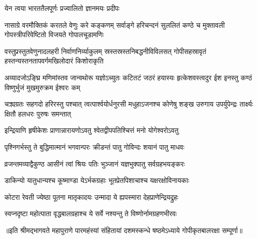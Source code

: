 

{येन त्वया भारततैलपूर्णः प्रज्वालितो ज्ञानमयः प्रदीपः}

{नासाग्रे वरमौक्तिकं करतले वेणुः करे कङ्कणम्}
{सर्वाङ्गे हरिचन्दनं सुललितं कण्ठे च मुक्तावली}
{गोपस्त्रीपरिवेष्टितो विजयते गोपालचूडामणिः}

{वस्तुप्रस्तुतवेणुनादलहरी निर्वाणनिर्व्याकुलम्}
{स्रस्तस्रस्तनिबद्धनीविविलसत् गोपीसहस्रावृतं}
{हस्तन्यस्तनतापवर्गमखिलोदारं किशोराकृति}


\fourlineindentedshloka
{अव्यादजोऽङ्घ्रि मणिमांस्तव जान्वथोरू}
{यज्ञोऽच्युतः कटितटं जठरं हयास्यः}
{हृत्केशवस्त्वदुर ईश इनस्तु कण्ठं}
{विष्णुर्भुजं मुखमुरुक्रम ईश्वरः कम्}

\fourlineindentedshloka
{चक्र्यग्रतः सहगदो हरिरस्तु पश्चात्}
{त्वत्पार्श्वयोर्धनुरसी मधुहाऽजनश्च}
{कोणेषु शङ्ख उरुगाय उपर्युपेन्द्रः}
{तार्क्ष्यः क्षितौ हलधरः पुरुषः समन्तात्}

\twolineshloka
{इन्द्रियाणि हृषीकेशः प्राणान्नारायणोऽवतु}
{श्वेतद्वीपपतिश्चित्तं मनो योगेश्वरोऽवतु}

\twolineshloka
{पृश्निगर्भस्तु ते बुद्धिमात्मानं भगवान्परः}
{क्रीडन्तं पातु गोविन्दः शयानं पातु माधवः}

\twolineshloka
{व्रजन्तमव्याद्वैकुण्ठ आसीनं त्वां श्रियः पतिः}
{भुञ्जानं यज्ञभुक्पातु सर्वग्रहभयङ्करः}

\twolineshloka
{डाकिन्यो यातुधान्यश्च कूष्माण्डा येऽर्भकग्रहाः}
{भूतप्रेतपिशाचाश्च यक्षरक्षोविनायकाः}

\twolineshloka
{कोटरा रेवती ज्येष्ठा पूतना मातृकादयः}
{उन्मादा ये ह्यपस्मारा देहप्राणेन्द्रियद्रुहः}

\twolineshloka
{स्वप्नदृष्टा महोत्पाता वृद्धबालग्रहाश्च ये}
{सर्वे नश्यन्तु ते विष्णोर्नामग्रहणभीरवः}

{॥इति श्रीमद्भागवते महापुराणे पारमहंस्यां संहितायां दशमस्कन्धे षष्ठमेऽध्याये गोपीकृतबालरक्षा सम्पूर्णा॥}